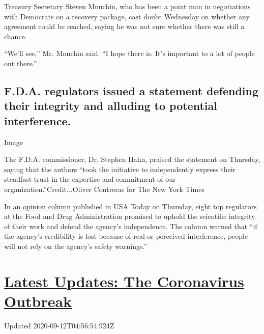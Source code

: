 Treasury Secretary Steven Mnuchin, who has been a point man in
negotiations with Democrats on a recovery package, cast doubt Wednesday
on whether any agreement could be reached, saying he was not sure
whether there was still a chance.

``We'll see,'' Mr. Mnuchin said. ``I hope there is. It's important to a
lot of people out there.''

\hypertarget{fda-regulators-issued-a-statement-defending-their-integrity-and-alluding-to-potential-interference}{%
\subsection{F.D.A. regulators issued a statement defending their
integrity and alluding to potential
interference.}\label{fda-regulators-issued-a-statement-defending-their-integrity-and-alluding-to-potential-interference}}

Image

The F.D.A. commissioner, Dr. Stephen Hahn, praised the statement on
Thursday, saying that the authors ``took the initiative to independently
express their steadfast trust in the expertise and commitment of our
organization.''Credit...Oliver Contreras for The New York Times

In
\href{https://www.usatoday.com/story/opinion/2020/09/10/sound-science-to-meet-covid-challenges-fda-career-officials-column/5756948002/}{an
opinion column} published in USA Today on Thursday, eight top regulators
at the Food and Drug Administration promised to uphold the scientific
integrity of their work and defend the agency's independence. The column
warned that ``if the agency's credibility is lost because of real or
perceived interference, people will not rely on the agency's safety
warnings.''

\hypertarget{latest-updates-the-coronavirus-outbreak}{%
\section{\texorpdfstring{\href{https://www.nytimes3xbfgragh.onion/2020/09/11/world/covid-19-coronavirus.html?action=click\&pgtype=Article\&state=default\&region=MAIN_CONTENT_1\&context=storylines_live_updates}{Latest
Updates: The Coronavirus
Outbreak}}{Latest Updates: The Coronavirus Outbreak}}\label{latest-updates-the-coronavirus-outbreak}}

Updated 2020-09-12T04:56:54.924Z

